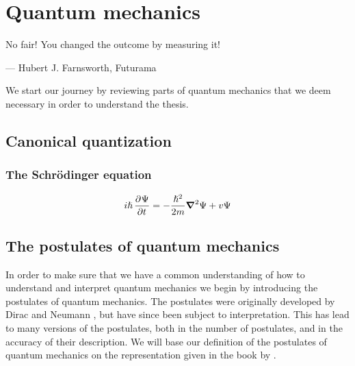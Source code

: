 \chapter{Quantum mechanics}
    \epigraph{No fair! You changed the outcome by measuring it!}
    {--- Hubert J. Farnsworth, Futurama}

    We start our journey by reviewing parts of quantum mechanics that we deem
    necessary in order to understand the thesis.


    \section{Canonical quantization}
        \subsection{The Schrödinger equation}
            \begin{align}
                i\hslash\dpd{\Psi}{t}
                = -\frac{\hslash^2}{2m}\vfg{\nabla}^2\Psi
                +    v\Psi
                \label{eq:coordinate-tdse}
            \end{align}

    \section{The postulates of quantum mechanics}
        In order to make sure that we have a common understanding of how to
        understand and interpret quantum mechanics we begin by introducing the
        postulates of quantum mechanics.
        The postulates were originally developed by Dirac
        \cite{dirac1981principles} and Neumann \cite{von2018mathematical},
        but have since been subject to interpretation.
        This has lead to many versions of the postulates, both in the number of
        postulates, and in the accuracy of their description.
        We will base our definition of the postulates of quantum mechanics on
        the representation given in the book  by
        \citeauthor{salasnich2017quantum} \cite{salasnich2017quantum}.

